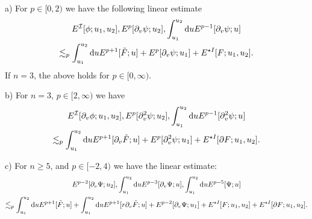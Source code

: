 \documentclass[11pt, oneside]{amsart}
\begin{document}
\begin{lemma}\label{rp}
	
	a)
	For $p\in[0,2)$ we have the following linear estimate
	\begin{equation*}
		\begin{gathered}
		E^{\mathcal{I}}[\phi;u_1,u_2],E^p[\partial_v\psi;u_2],\int_{u_1}^{u_2}\mathrm{d} u E^{p-1}[\partial_v\psi;u]\\\lesssim_p \int_{u_1}^{u_2}\mathrm{d} u E^{p+1}[\tilde{F};u]+E^p[\partial_v\psi;u_1]+E^{\star I}[F;u_1,u_2].
		\end{gathered}
	\end{equation*}
	If $n=3$, the above holds for $p\in[0,\infty)$.
	
	b) For $n=3$, $p\in[2,\infty)$ we have
	\begin{equation*}
		\begin{gathered}
				E^{\mathcal{I}}[\partial_v\phi;u_1,u_2],E^p[\partial_v^2\psi;u_2],\int_{u_1}^{u_2}\mathrm{d} u E^{p-1}[\partial_v^2\psi;u]
			\\\lesssim_p \int_{u_1}^{u_2}\mathrm{d} u E^{p+1}[\partial_v \tilde{F};u]+E^p[\partial_v^2\psi;u_1]+E^{\star I}[\partial F;u_1,u_2].
		\end{gathered}
	\end{equation*}
	
	c)
	For $n\geq5$, and $p\in[-2,4)$ we have the linear estimate:
	\begin{equation*}
		\begin{gathered}
			E^{p-2}[\partial_v\Psi;u_2],\int_{u_1}^{u_2}\mathrm{d} u E^{p-3}[\partial_v\Psi;u],\int_{u_1}^{u_2}\mathrm{d} u E^{p-5}[\Psi;u]\\
			\lesssim_p\int_{u_1}^{u_2}\mathrm{d} u E^{p+1}[\tilde{F};u]+\int_{u_1}^{u_2}\mathrm{d} u E^{p+1}[r\partial_v\tilde{F};u]+E^{p-2}[\partial_v\Psi;u_1]+E^{\star I}[F;u_1,u_2]+E^{\star I}[\partial F;u_1,u_2].
		\end{gathered}
	\end{equation*}
\end{lemma}
\end{document}
